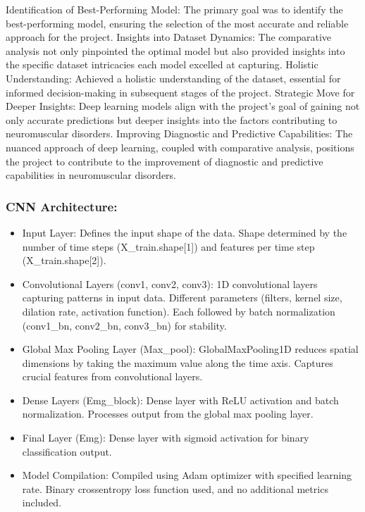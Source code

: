 \documentclass[ 12pt,a4paper,twocolumn,fleqn]{report}
\begin{document}
\newpage
  \pagestyle{fancy}
\thisfancypage{%
  \setlength{\fboxsep}{20pt}\doublebox}{}
\normalsize
Identification of Best-Performing Model: The primary goal was to identify the best-performing
model, ensuring the selection of the most accurate and reliable approach for the project.
Insights into Dataset Dynamics: The comparative analysis not only pinpointed the optimal
model but also provided insights into the specific dataset intricacies each model excelled at
capturing.
Holistic Understanding: Achieved a holistic understanding of the dataset, essential for informed
decision-making in subsequent stages of the project.
Strategic Move for Deeper Insights: Deep learning models align with the project's goal of
gaining not only accurate predictions but deeper insights into the factors contributing to
neuromuscular disorders.
Improving Diagnostic and Predictive Capabilities: The nuanced approach of deep learning,
coupled with comparative analysis, positions the project to contribute to the improvement of
diagnostic and predictive capabilities in neuromuscular disorders.\\
\subsubsection{CNN Architecture:}
\vspace{2mm}
\begin{itemize}
    \item Input Layer: Defines the input shape of the data. Shape determined by the number of time steps
(X\_train.shape[1]) and features per time step (X\_train.shape[2]).
\item Convolutional Layers (conv1, conv2, conv3): 1D convolutional layers capturing patterns in
input data. Different parameters (filters, kernel size, dilation rate, activation function). Each
followed by batch normalization (conv1\_bn, conv2\_bn, conv3\_bn) for stability.
\item Global Max Pooling Layer (Max\_pool): GlobalMaxPooling1D reduces spatial dimensions by
taking the maximum value along the time axis. Captures crucial features from convolutional
layers.
\item Dense Layers (Emg\_block): Dense layer with ReLU activation and batch normalization.
Processes output from the global max pooling layer.
\item Final Layer (Emg): Dense layer with sigmoid activation for binary classification output.
\item Model Compilation: Compiled using Adam optimizer with specified learning rate. Binary crossentropy loss function used, and no additional metrics included.
\end{itemize}
\newpage
  \pagestyle{fancy}
\thisfancypage{%
  \setlength{\fboxsep}{20pt}\doublebox}{}
\normalsize
\end{document}
